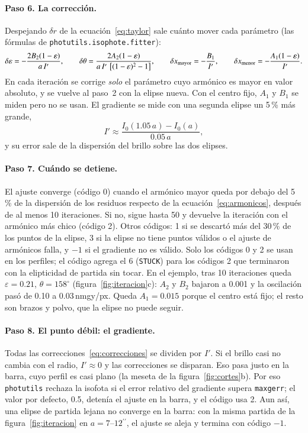 \documentclass[11pt,a4paper]{article}
\newcommand{\as}{\ensuremath{^{\prime\prime}}}
\newcommand{\code}[1]{\texttt{#1}}
\begin{document}
\paragraph{Paso 6. La corrección.} Despejando $\delta r$ de la ecuación~\eqref{eq:taylor} sale cuánto mover cada
parámetro (las fórmulas de \code{photutils.isophote.fitter}):
\begin{equation}\label{eq:correcciones}
\delta\varepsilon = -\frac{2B_2(1-\varepsilon)}{a\,I'}, \qquad
\delta\theta = \frac{2A_2(1-\varepsilon)}{a\,I'\,\left[(1-\varepsilon)^2 - 1\right]}, \qquad
\delta x_{\rm mayor} = -\frac{B_1}{I'}, \qquad
\delta x_{\rm menor} = -\frac{A_1(1-\varepsilon)}{I'} .
\end{equation}
En cada iteración se corrige \emph{solo} el parámetro cuyo armónico es mayor en valor absoluto, y se vuelve al
paso~2 con la elipse nueva. Con el centro fijo, $A_1$ y $B_1$ se miden pero no se usan. El gradiente se mide con
una segunda elipse un 5\,\% más grande,
\begin{equation}
I' \approx \frac{I_0(1.05\,a) - I_0(a)}{0.05\,a} ,
\end{equation}
y su error sale de la dispersión del brillo sobre las dos elipses.

\paragraph{Paso 7. Cuándo se detiene.} El ajuste converge (código 0) cuando el armónico mayor queda por debajo
del 5\,\% de la dispersión de los residuos respecto de la ecuación~\eqref{eq:armonicos}, después de al menos 10
iteraciones. Si no, sigue hasta 50 y devuelve la iteración con el armónico más chico (código 2). Otros códigos:
1 si se descartó más del 30\,\% de los puntos de la elipse, 3 si la elipse no tiene puntos válidos o el ajuste de armónicos falla,
y $-1$ si el gradiente no es válido. Solo los códigos 0 y 2 se usan en los perfiles; el código agrega el 6
(\code{STUCK}) para los códigos 2 que terminaron con la elipticidad de partida sin tocar. En el ejemplo, tras 10
iteraciones queda $\varepsilon = 0.21$, $\theta = 158^\circ$ (figura~\ref{fig:iteracion}c): $A_2$ y $B_2$
bajaron a 0.001 y la oscilación pasó de 0.10 a 0.03\,nmgy/px. Queda $A_1 = 0.015$ porque el centro está fijo; el
resto son brazos y polvo, que la elipse no puede seguir.

\paragraph{Paso 8. El punto débil: el gradiente.} Todas las correcciones~\eqref{eq:correcciones} se dividen por
$I'$. Si el brillo casi no cambia con el radio, $I' \approx 0$ y las correcciones se disparan. Eso pasa justo en
la barra, cuyo perfil es casi plano (la meseta de la figura~\ref{fig:cortes}b). Por eso \code{photutils} rechaza
la isofota si el error relativo del gradiente supera \code{maxgerr}; el valor por defecto, 0.5, detenía el ajuste
en la barra, y el código usa 2. Aun así, una elipse de partida lejana no converge en la barra: con la misma
partida de la figura~\ref{fig:iteracion} en $a = 7$--$12\as$, el ajuste se aleja y termina con código $-1$.
\end{document}
